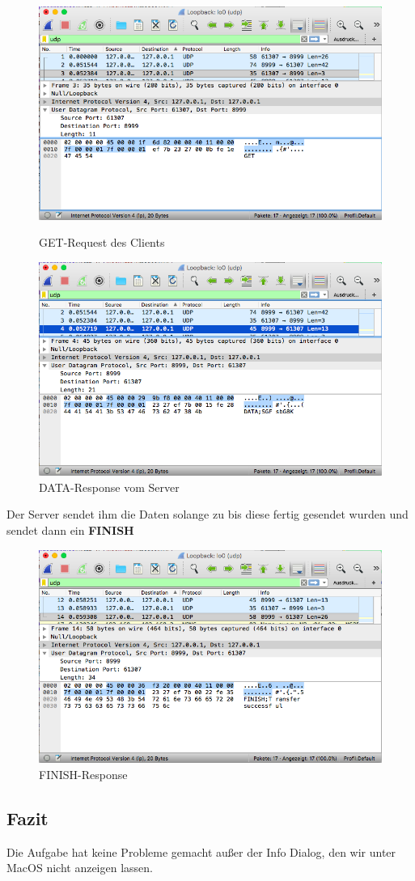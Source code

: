 \begin{figure}[H]
	\begin{minipage}[b]{.5 \linewidth}
		\centering
		\includegraphics[width=.95 \linewidth]{images/w08}
		\caption{GET-Request des Clients}
	\end{minipage}
	\begin{minipage}[b]{.5 \linewidth}
		\centering
		\includegraphics[width=.95 \linewidth]{images/w09}
		\caption{DATA-Response vom Server}
	\end{minipage}
\end{figure}
Der Server sendet ihm die Daten solange zu bis diese fertig gesendet wurden und sendet dann ein \textbf{FINISH}
\begin{figure}[H]
	\centering
	\includegraphics[width=0.6 \linewidth]{images/w10}
	\caption{FINISH-Response} \label{ordner}
\end{figure} 

\subsection{Fazit}
Die Aufgabe hat keine Probleme gemacht außer der Info Dialog, den wir unter MacOS nicht anzeigen lassen.